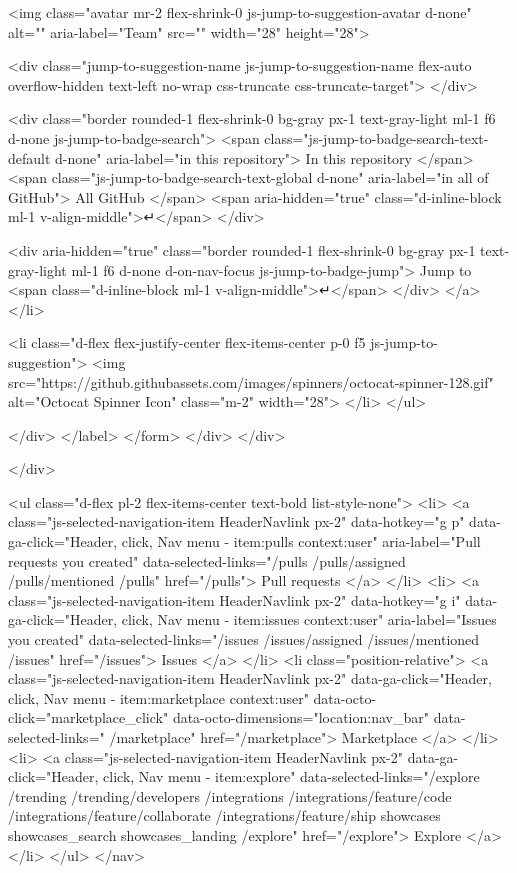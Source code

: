     <img class="avatar mr-2 flex-shrink-0 js-jump-to-suggestion-avatar d-none" alt="" aria-label="Team" src="" width="28" height="28">

    <div class="jump-to-suggestion-name js-jump-to-suggestion-name flex-auto overflow-hidden text-left no-wrap css-truncate css-truncate-target">
    </div>

    <div class="border rounded-1 flex-shrink-0 bg-gray px-1 text-gray-light ml-1 f6 d-none js-jump-to-badge-search">
      <span class="js-jump-to-badge-search-text-default d-none" aria-label="in this repository">
        In this repository
      </span>
      <span class="js-jump-to-badge-search-text-global d-none" aria-label="in all of GitHub">
        All GitHub
      </span>
      <span aria-hidden="true" class="d-inline-block ml-1 v-align-middle">↵</span>
    </div>

    <div aria-hidden="true" class="border rounded-1 flex-shrink-0 bg-gray px-1 text-gray-light ml-1 f6 d-none d-on-nav-focus js-jump-to-badge-jump">
      Jump to
      <span class="d-inline-block ml-1 v-align-middle">↵</span>
    </div>
  </a>
</li>


    <li class="d-flex flex-justify-center flex-items-center p-0 f5 js-jump-to-suggestion">
      <img src="https://github.githubassets.com/images/spinners/octocat-spinner-128.gif" alt="Octocat Spinner Icon" class="m-2" width="28">
    </li>
</ul>

            </div>
      </label>
</form>  </div>
</div>

            </div>

          <ul class="d-flex pl-2 flex-items-center text-bold list-style-none">
            <li>
              <a class="js-selected-navigation-item HeaderNavlink px-2" data-hotkey="g p" data-ga-click="Header, click, Nav menu - item:pulls context:user" aria-label="Pull requests you created" data-selected-links="/pulls /pulls/assigned /pulls/mentioned /pulls" href="/pulls">
                Pull requests
</a>            </li>
            <li>
              <a class="js-selected-navigation-item HeaderNavlink px-2" data-hotkey="g i" data-ga-click="Header, click, Nav menu - item:issues context:user" aria-label="Issues you created" data-selected-links="/issues /issues/assigned /issues/mentioned /issues" href="/issues">
                Issues
</a>            </li>
              <li class="position-relative">
                <a class="js-selected-navigation-item HeaderNavlink px-2" data-ga-click="Header, click, Nav menu - item:marketplace context:user" data-octo-click="marketplace_click" data-octo-dimensions="location:nav_bar" data-selected-links=" /marketplace" href="/marketplace">
                   Marketplace
</a>                  
              </li>
            <li>
              <a class="js-selected-navigation-item HeaderNavlink px-2" data-ga-click="Header, click, Nav menu - item:explore" data-selected-links="/explore /trending /trending/developers /integrations /integrations/feature/code /integrations/feature/collaborate /integrations/feature/ship showcases showcases_search showcases_landing /explore" href="/explore">
                Explore
</a>            </li>
          </ul>
      </nav>

